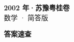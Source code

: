 \documentclass[zihao=-4, a4paper]{ctexart}
\begin{document}
\begin{center}
  {\Large\bfseries 2002 年·苏豫粤桂卷}\\[4pt]
  {\large 数学 · 简答版}
\end{center}
\medskip
{}

\clearpage
{}
\begin{center}{\Large\bfseries 答案速查}\end{center}
\medskip

\end{document}
